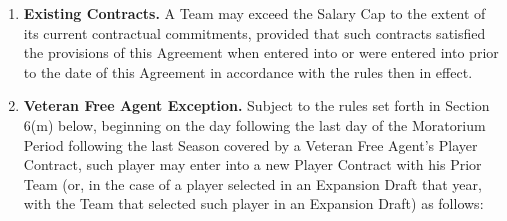 \documentclass[
]{book}
\providecommand{\tightlist}{%
  \setlength{\itemsep}{0pt}\setlength{\parskip}{0pt}}
\begin{document}
\begin{enumerate}
\def\labelenumi{(\alph{enumi})}
\tightlist
\item
  \textbf{Existing Contracts.} A Team may exceed the Salary Cap to the extent of its current contractual commitments, provided that such contracts satisfied the provisions of this Agreement when entered into or were entered into prior to the date of this Agreement in accordance with the rules then in effect.
\item
  \textbf{Veteran Free Agent Exception.} Subject to the rules set forth in Section 6(m) below, beginning on the day following the last day of the Moratorium Period following the last Season covered by a Veteran Free Agent's Player Contract, such player may enter into a new Player Contract with his Prior Team (or, in the case of a player selected in an Expansion Draft that year, with the Team that selected such player in an Expansion Draft) as follows:


\end{enumerate}
\end{document}
